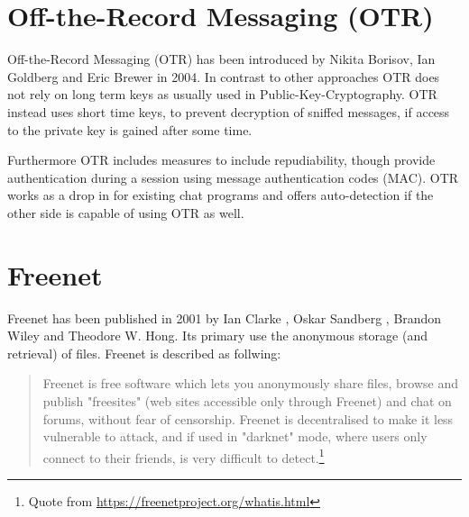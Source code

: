 \section{Off-the-Record Messaging (OTR)}
Off-the-Record Messaging (OTR) has been introduced by
Nikita Borisov, Ian Goldberg and Eric Brewer in 2004.\cite{otr}
In contrast to other approaches OTR does not rely on long term
keys as usually used in Public-Key-Cryptography. OTR instead
uses short time keys, to prevent decryption of sniffed messages,
if access to the private key is gained after some time.

Furthermore OTR includes measures to include repudiability, though
provide authentication during a session using
message authentication codes (MAC).
OTR works as a drop in for existing chat programs and offers auto-detection
if the other side is capable of using OTR as well.
\section{Freenet}
Freenet has been published in 2001 by
Ian Clarke , Oskar Sandberg , Brandon Wiley and Theodore W. Hong.\cite{freenet}
Its primary use the anonymous storage (and retrieval) of files.
Freenet is described as follwing:
\begin{quote}
Freenet is free software which lets you anonymously share files, browse and publish "freesites" (web sites accessible only through Freenet) and chat on forums, without fear of censorship. Freenet is decentralised to make it less vulnerable to attack, and if used in "darknet" mode, where users only connect to their friends, is very difficult to detect.\footnote{Quote from \url{https://freenetproject.org/whatis.html}}
\end{quote}
